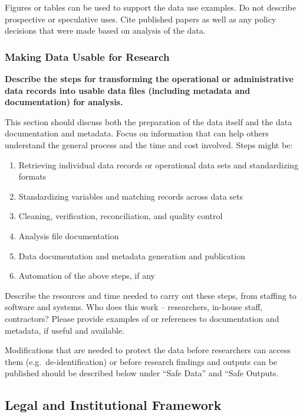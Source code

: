 \documentclass[
]{book}
\providecommand{\tightlist}{%
  \setlength{\itemsep}{0pt}\setlength{\parskip}{0pt}}
\begin{document}
Figures or tables can be used to support the data use examples. Do not describe prospective or speculative uses. Cite published papers as well as any policy decisions that were made based on analysis of the data.

\hypertarget{making-data-usable-for-research-7}{%
\subsubsection*{Making Data Usable for Research}\label{making-data-usable-for-research-7}}

\textbf{Describe the steps for transforming the operational or administrative data records into usable data files (including metadata and documentation) for analysis.}

This section should discuss both the preparation of the data itself and the data documentation and metadata. Focus on information that can help others understand the general process and the time and cost involved. Steps might be:

\begin{enumerate}
\def\labelenumi{\arabic{enumi}.}
\tightlist
\item
  Retrieving individual data records or operational data sets and standardizing formats
\item
  Standardizing variables and matching records across data sets
\item
  Cleaning, verification, reconciliation, and quality control
\item
  Analysis file documentation
\item
  Data documentation and metadata generation and publication
\item
  Automation of the above steps, if any
\end{enumerate}

Describe the resources and time needed to carry out these steps, from staffing to software and systems. Who does this work -- researchers, in-house staff, contractors? Please provide examples of or references to documentation and metadata, if useful and available.

Modifications that are needed to protect the data before researchers can access them (e.g.~de-identification) or before research findings and outputs can be published should be described below under ``Safe Data'' and ``Safe Outputs.

\hypertarget{legal-and-institutional-framework-8}{%
\subsection*{Legal and Institutional Framework}\label{legal-and-institutional-framework-8}}
\end{document}
